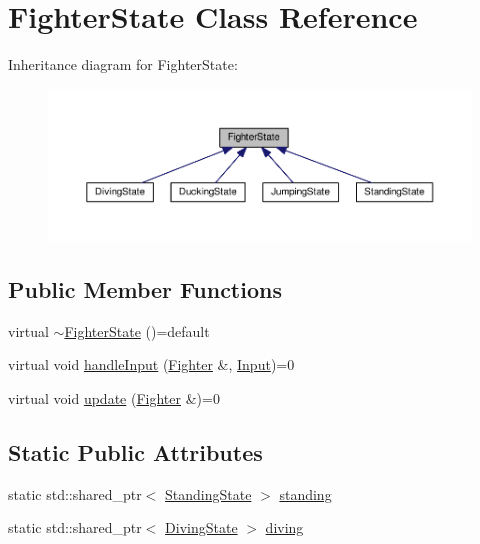 \hypertarget{classFighterState}{}\section{Fighter\+State Class Reference}
\label{classFighterState}


Inheritance diagram for Fighter\+State\+:
\nopagebreak
\begin{figure}[H]
\begin{center}
\leavevmode
\includegraphics[width=350pt]{classFighterState__inherit__graph}
\end{center}
\end{figure}
\subsection*{Public Member Functions}
\begin{DoxyCompactItemize}
\item 
virtual \hyperlink{classFighterState_a5ee5999d79f6a7e8cdf386cbf05fb941}{$\sim$\+Fighter\+State} ()=default
\item 
virtual void \hyperlink{classFighterState_a84fcd7da4d232e79e1be9b32c0767861}{handle\+Input} (\hyperlink{classFighter}{Fighter} \&, \hyperlink{State_8cpp_a080a822f0093973313bd644e517a5090}{Input})=0
\item 
virtual void \hyperlink{classFighterState_af022f76c6b1fe080047ded2280ec6f8f}{update} (\hyperlink{classFighter}{Fighter} \&)=0
\end{DoxyCompactItemize}
\subsection*{Static Public Attributes}
\begin{DoxyCompactItemize}
\item 
static std\+::shared\+\_\+ptr$<$ \hyperlink{classStandingState}{Standing\+State} $>$ \hyperlink{classFighterState_a050e9b5aff81843be5feea296a586889}{standing}
\item 
static std\+::shared\+\_\+ptr$<$ \hyperlink{classDivingState}{Diving\+State} $>$ \hyperlink{classFighterState_ad4f8371e5a2d9e5b165d5c41072eb6d9}{diving}
\end{DoxyCompactItemize}


